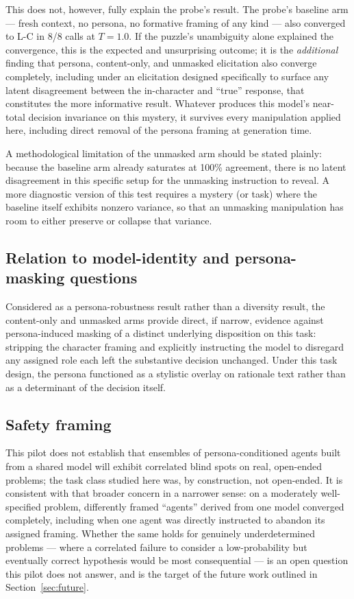\documentclass[11pt]{article}
\begin{document}
This does not, however, fully explain the probe's result. The probe's baseline arm --- fresh
context, no persona, no formative framing of any kind --- also converged to L-C in 8/8 calls at
$T{=}1.0$. If the puzzle's unambiguity alone explained the convergence, this is the expected and
unsurprising outcome; it is the \emph{additional} finding that persona, content-only, and unmasked
elicitation also converge completely, including under an elicitation designed specifically to
surface any latent disagreement between the in-character and ``true'' response, that constitutes
the more informative result. Whatever produces this model's near-total decision invariance on this
mystery, it survives every manipulation applied here, including direct removal of the persona
framing at generation time.

A methodological limitation of the unmasked arm should be stated plainly: because the baseline arm
already saturates at 100\% agreement, there is no latent disagreement in this specific setup for
the unmasking instruction to reveal. A more diagnostic version of this test requires a mystery (or
task) where the baseline itself exhibits nonzero variance, so that an unmasking manipulation has
room to either preserve or collapse that variance.

\subsection{Relation to model-identity and persona-masking questions}

Considered as a persona-robustness result rather than a diversity result, the content-only and
unmasked arms provide direct, if narrow, evidence against persona-induced masking of a distinct
underlying disposition on this task: stripping the character framing and explicitly instructing
the model to disregard any assigned role each left the substantive decision unchanged. Under this
task design, the persona functioned as a stylistic overlay on rationale text rather than as a
determinant of the decision itself.

\subsection{Safety framing}

This pilot does not establish that ensembles of persona-conditioned agents built from a shared
model will exhibit correlated blind spots on real, open-ended problems; the task class studied here
was, by construction, not open-ended. It is consistent with that broader concern in a narrower
sense: on a moderately well-specified problem, differently framed ``agents'' derived from one model
converged completely, including when one agent was directly instructed to abandon its assigned
framing. Whether the same holds for genuinely underdetermined problems --- where a correlated
failure to consider a low-probability but eventually correct hypothesis would be most
consequential --- is an open question this pilot does not answer, and is the target of the future
work outlined in Section~\ref{sec:future}.
\end{document}
